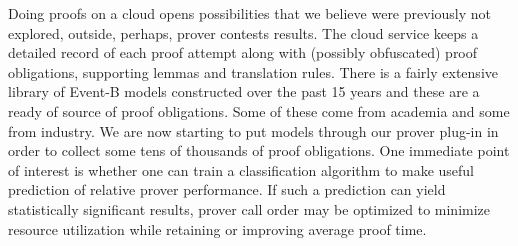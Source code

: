 \documentclass[twocolumn,a4paper,10pt]{article}
\begin{document}
Doing proofs on a cloud opens possibilities that we believe were previously not explored, outside, perhaps, prover contests results. The cloud service keeps a detailed record of each proof attempt along with (possibly obfuscated) proof obligations, supporting lemmas and translation rules. There is a fairly extensive library of Event-B models constructed over the past 15 years and these are a ready of source of proof obligations. Some of these come from academia and some from industry. We are now starting to put models through our prover plug-in in order to collect some tens of thousands of proof obligations. One immediate point of interest is whether one can train a classification algorithm to make useful prediction of relative prover performance. If such a prediction can yield statistically significant results, prover call order may be optimized to minimize resource utilization while retaining or improving average proof time. 



\end{document}
